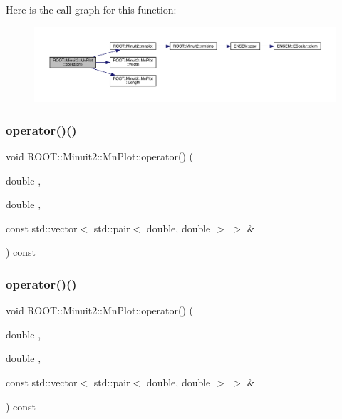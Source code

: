 Here is the call graph for this function\+:
\nopagebreak
\begin{figure}[H]
\begin{center}
\leavevmode
\includegraphics[width=350pt]{d1/d62/classROOT_1_1Minuit2_1_1MnPlot_a6cae4ab8961e9f7933320789d101ec1e_cgraph}
\end{center}
\end{figure}
\mbox{\label{classROOT_1_1Minuit2_1_1MnPlot_a6cae4ab8961e9f7933320789d101ec1e}} 
\subsubsection{\texorpdfstring{operator()()}{operator()()}\hspace{0.1cm}{\footnotesize\ttfamily [5/6]}}
{\footnotesize\ttfamily void R\+O\+O\+T\+::\+Minuit2\+::\+Mn\+Plot\+::operator() (\begin{DoxyParamCaption}\item[{double}]{,  }\item[{double}]{,  }\item[{const std\+::vector$<$ std\+::pair$<$ double, double $>$ $>$ \&}]{ }\end{DoxyParamCaption}) const}

\mbox{\label{classROOT_1_1Minuit2_1_1MnPlot_a6cae4ab8961e9f7933320789d101ec1e}} 
\subsubsection{\texorpdfstring{operator()()}{operator()()}\hspace{0.1cm}{\footnotesize\ttfamily [6/6]}}
{\footnotesize\ttfamily void R\+O\+O\+T\+::\+Minuit2\+::\+Mn\+Plot\+::operator() (\begin{DoxyParamCaption}\item[{double}]{,  }\item[{double}]{,  }\item[{const std\+::vector$<$ std\+::pair$<$ double, double $>$ $>$ \&}]{ }\end{DoxyParamCaption}) const}

